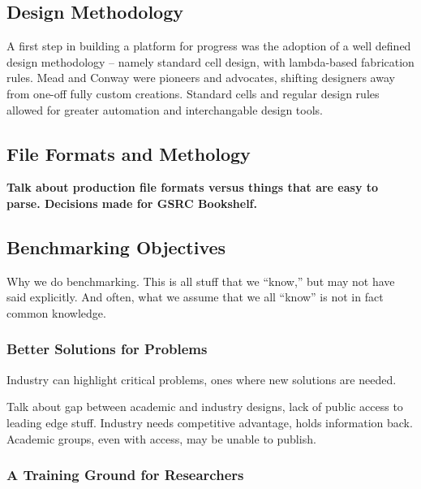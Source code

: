\documentclass[sigconf]{acmart}
\begin{document}
\subsection{Design Methodology}

A first step in building a platform for progress was the adoption
of a well defined design methodology -- namely standard cell design,
with lambda-based fabrication rules.  Mead and Conway were pioneers
and advocates\cite{Mead93}, shifting designers away from one-off
fully custom creations.  Standard cells and regular design rules allowed
for greater automation and interchangable design tools.

\subsection{File Formats and Methology}

{\bf Talk about production file formats versus things that
  are easy to parse.  Decisions made for GSRC Bookshelf.}

\cite{Caldwell000693}\cite{umichbookshelf}

\subsection{Benchmarking Objectives}

Why we do benchmarking.  This is all stuff that we ``know,'' but
may not have said explicitly.  And often, what we assume that we
all ``know'' is not in fact common knowledge.


\subsubsection{Better Solutions for Problems}

Industry can highlight critical problems, ones where new solutions
are needed.

Talk about gap between academic and industry designs, lack of
public access to leading edge stuff.  Industry needs competitive
advantage, holds information back.  Academic groups, even
with access, may be unable to publish.


\subsubsection{A Training Ground for Researchers}
\end{document}
